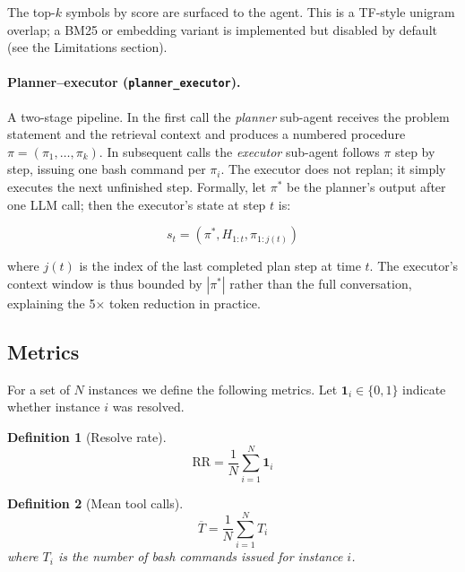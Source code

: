 \documentclass[11pt]{article}
\newtheorem{definition}{Definition}
\begin{document}
The top-$k$ symbols by score are surfaced to the agent.  This is a TF-style
unigram overlap; a BM25 or embedding variant is implemented but disabled by
default (see the Limitations section).

\paragraph{Planner--executor (\texttt{planner\_executor}).}
A two-stage pipeline.  In the first call the \emph{planner} sub-agent
receives the problem statement and the retrieval context and produces a
numbered procedure $\pi = (\pi_1, \ldots, \pi_k)$.  In subsequent calls the
\emph{executor} sub-agent follows $\pi$ step by step, issuing one bash command
per $\pi_i$.  The executor does not replan; it simply executes the next
unfinished step.  Formally, let $\pi^*$ be the planner's output after one
LLM call; then the executor's state at step $t$ is:

\begin{equation}
  s_t = (\pi^*, H_{1:t}, \pi_{1:j(t)})
  \label{eq:executor-state}
\end{equation}

where $j(t)$ is the index of the last completed plan step at time $t$.
The executor's context window is thus bounded by $|\pi^*|$ rather than the
full conversation, explaining the 5$\times$ token reduction in practice.

\subsection{Metrics}
\label{sec:metrics}

For a set of $N$ instances we define the following metrics.  Let
$\mathbf{1}_i \in \{0, 1\}$ indicate whether instance $i$ was resolved.

\begin{definition}[Resolve rate]
\begin{equation}
  \text{RR} = \frac{1}{N}\sum_{i=1}^{N} \mathbf{1}_i
  \label{eq:resolve-rate}
\end{equation}
\end{definition}

\begin{definition}[Mean tool calls]
\begin{equation}
  \overline{T} = \frac{1}{N}\sum_{i=1}^{N} T_i
  \label{eq:mean-steps}
\end{equation}
where $T_i$ is the number of bash commands issued for instance $i$.
\end{definition}
\end{document}
